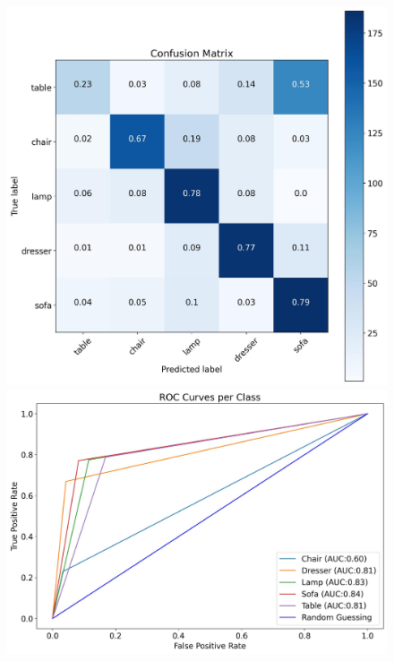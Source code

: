 \documentclass[11pt,a4paper]{article}
\begin{document}
\begin{figure}[H]
{{    \includegraphics[scale=0.13]{imgs/experiments/pointclouds/pointnet-3/PointNet-3-TESTING-confusion-matrix.jpg}
    \includegraphics[scale=0.13]{imgs/experiments/pointclouds/pointnet-3/PointNet-3-TESTING-ROC.jpg}
    }}
    \qquad
\end{figure}
\end{document}
